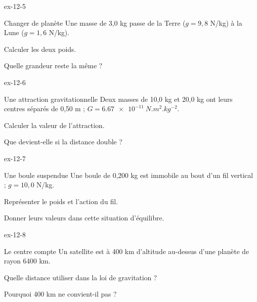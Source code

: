 \begin{blocLivre}{ex-12-5}\begin{exercice}[2]{Changer de planète}
Une masse de 3,0 kg passe de la Terre ($g=9,8$ N/kg) à la Lune ($g=1,6$ N/kg).
\begin{questions}
\item Calculer les deux poids.
\item Quelle grandeur reste la même ?
\end{questions}
\end{exercice}\end{blocLivre}
\begin{blocLivre}{ex-12-6}\begin{exercice}[2]{Une attraction gravitationnelle}
Deux masses de 10,0 kg et 20,0 kg ont leurs centres séparés de 0,50 m ; $G=\qty{6,67e-11}{N.m^2.kg^{-2}}$.
\begin{questions}
\item Calculer la valeur de l’attraction.
\item Que devient-elle si la distance double ?
\end{questions}
\end{exercice}\end{blocLivre}
\begin{blocLivre}{ex-12-7}\begin{exercice}[2]{Une boule suspendue}
Une boule de 0,200 kg est immobile au bout d’un fil vertical ; $g=10,0$ N/kg.
\begin{questions}
\item Représenter le poids et l’action du fil.
\item Donner leurs valeurs dans cette situation d’équilibre.
\end{questions}
\end{exercice}\end{blocLivre}
\begin{blocLivre}{ex-12-8}\begin{exercice}[2]{Le centre compte}
Un satellite est à 400 km d’altitude au-dessus d’une planète de rayon 6400 km.
\begin{questions}
\item Quelle distance utiliser dans la loi de gravitation ?
\item Pourquoi 400 km ne convient-il pas ?
\end{questions}
\end{exercice}\end{blocLivre}
